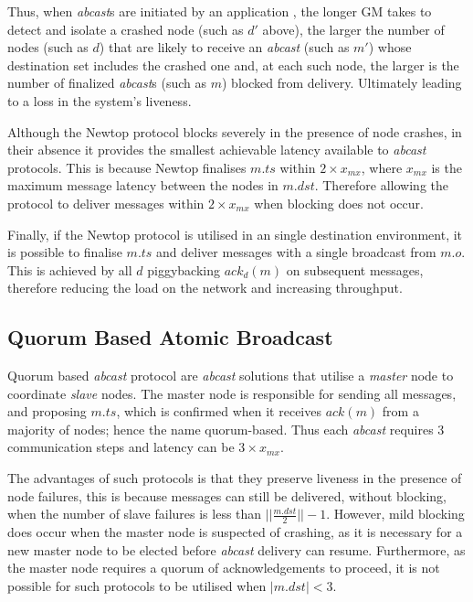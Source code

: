 Thus, when \emph{abcast}s are initiated by an application , the longer GM takes to detect and isolate a crashed node (such as $d'$ above), the larger the number of nodes (such as $d$) that are likely to receive an \emph{abcast} (such as $m'$) whose destination set includes the crashed one and, at each such node, the larger is the number of finalized \emph{abcast}s (such as $m$) blocked from delivery.  Ultimately leading to a loss in the system's liveness.  

Although the Newtop protocol blocks severely in the presence of node crashes, in their absence it provides the smallest achievable latency available to \emph{abcast} protocols.  This is because Newtop finalises $m.ts$ within $2 \times x_{mx}$, where $x_{mx}$ is the maximum message latency between the nodes in $m.dst$.  Therefore allowing the protocol to deliver messages within $2 \times x_{mx}$ when blocking does not occur.  

Finally, if the Newtop protocol is utilised in an single destination environment, it is possible to finalise $m.ts$ and deliver messages with a single broadcast from $m.o$.  This is achieved by all $d$ piggybacking $ack_d(m)$ on subsequent messages, therefore reducing the load on the network and increasing throughput.  

	\subsection{Quorum Based Atomic Broadcast}
	Quorum based \emph{abcast} protocol are \emph{abcast} solutions that utilise a \emph{master} node to coordinate \emph{slave} nodes.  The master node is responsible for sending all messages, and proposing $m.ts$, which is confirmed when it receives $ack(m)$ from a majority of nodes; hence the name quorum-based.  Thus each \emph{abcast} requires 3 communication steps and latency can be $3 \times x_{mx}$.  
	
	The advantages of such protocols is that they preserve liveness in the presence of node failures, this is because messages can still be delivered, without blocking, when the number of slave failures is less than $\vert\vert \frac{m.dst}{2} \vert\vert - 1$.  However, mild blocking does occur when the master node is suspected of crashing, as it is necessary for a new master node to be elected before \emph{abcast} delivery can resume. Furthermore, as the master node requires a quorum of acknowledgements to proceed, it is not possible for such protocols to be utilised when $\left\vert m.dst \right\vert < 3$. 
	
